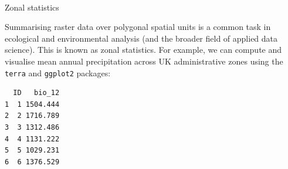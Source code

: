 \documentclass[
]{book}
\makeatletter
\let\oldparagraph\paragraph
\renewcommand{\paragraph}{
    \@ifstar
      \xxxParagraphStar
      \xxxParagraphNoStar
  }
\newcommand{\xxxParagraphStar}[1]{\oldparagraph*{#1}\mbox{}}
\newcommand{\xxxParagraphNoStar}[1]{\oldparagraph{#1}\mbox{}}
\newenvironment{Shaded}{\begin{snugshade}}{\end{snugshade}}
\newcommand{\AttributeTok}[1]{\textcolor[rgb]{0.40,0.45,0.13}{#1}}
\newcommand{\CommentTok}[1]{\textcolor[rgb]{0.37,0.37,0.37}{#1}}
\newcommand{\ConstantTok}[1]{\textcolor[rgb]{0.56,0.35,0.01}{#1}}
\newcommand{\DecValTok}[1]{\textcolor[rgb]{0.68,0.00,0.00}{#1}}
\newcommand{\FunctionTok}[1]{\textcolor[rgb]{0.28,0.35,0.67}{#1}}
\newcommand{\NormalTok}[1]{\textcolor[rgb]{0.00,0.23,0.31}{#1}}
\newcommand{\OtherTok}[1]{\textcolor[rgb]{0.00,0.23,0.31}{#1}}
\newcommand{\SpecialCharTok}[1]{\textcolor[rgb]{0.37,0.37,0.37}{#1}}
\makeatother
\begin{document}
\paragraph{Zonal statistics}\label{zonal-statistics}

Summarising raster data over polygonal spatial units is a common task in
ecological and environmental analysis (and the broader field of applied
data science). This is known as zonal statistics. For example, we can
compute and visualise mean annual precipitation across UK administrative
zones using the \texttt{terra} and \texttt{ggplot2} packages:

\begin{Shaded}
\end{Shaded}

\begin{verbatim}
  ID   bio_12
1  1 1504.444
2  2 1716.789
3  3 1312.486
4  4 1131.222
5  5 1029.231
6  6 1376.529
\end{verbatim}
\end{document}
